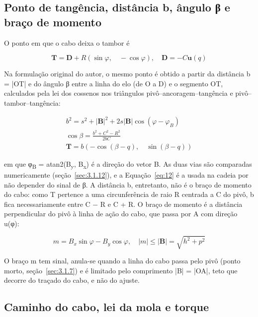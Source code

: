 \subsection{Ponto de tangência, distância b, ângulo β e braço de momento}\label{sec:3.1.5}

O ponto em que o cabo deixa o tambor é

\begin{equation}
  \mathbf{T} = \mathbf{D} + R(\sin\varphi,\quad - \cos\varphi),\quad\mathbf{D} = - C\mathbf{u}(q)
  \label{eq:12}
\end{equation}

Na formulação original do autor, o mesmo ponto é obtido a partir da distância b = |OT| e do ângulo β entre a linha do elo (de O a D) e o segmento OT, calculados pela lei dos cossenos nos triângulos pivô–ancoragem–tangência e pivô–tambor–tangência:

\begin{gather}
  b^{2} = s^{2} + \left| \mathbf{B} \right|^{2} + 2s\left| \mathbf{B} \right|\cos{(\varphi - \varphi_{B})} \label{eq:13} \\
  \cos\beta = \frac{b^{2} + C^{2} - R^{2}}{2bC} \label{eq:14} \\
  \mathbf{T} = b( - \cos{(\beta - q)},\quad\sin{(\beta - q)}) \label{eq:15}
\end{gather}

em que φ\textsubscript{B} = atan2(B\textsubscript{y}, B\textsubscript{x}) é a direção do vetor B. As duas vias são comparadas numericamente (seção~\ref{sec:3.1.12}), e a Equação~\eqref{eq:12} é a usada na cadeia por não depender do sinal de β. A distância b, entretanto, não é o braço de momento do cabo: como T pertence a uma circunferência de raio R centrada a C do pivô, b fica necessariamente entre C − R e C + R. O braço de momento é a distância perpendicular do pivô à linha de ação do cabo, que passa por A com direção u(φ):

\begin{equation}
  m = B_{x}\sin\varphi - B_{y}\cos\varphi,\quad|m| \leq \left| \mathbf{B} \right| = \sqrt{h^{2} + p^{2}}
  \label{eq:16}
\end{equation}

O braço m tem sinal, anula-se quando a linha do cabo passa pelo pivô (ponto morto, seção~\ref{sec:3.1.7}) e é limitado pelo comprimento |B| = |OA|, teto que decorre do traçado do cabo, e não do ajuste.

\subsection{Caminho do cabo, lei da mola e torque}\label{sec:3.1.6}

